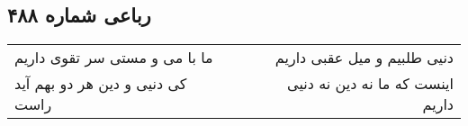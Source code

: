 \begin{center}
\section*{رباعی شماره ۴۸۸}
\label{sec:sh488}
\begin{longtable}{l p{0.5cm} r}
ما با می و مستی سر تقوی داریم
&&
دنیی طلبیم و میل عقبی داریم
\\
کی دنیی و دین هر دو بهم آید راست
&&
اینست که ما نه دین نه دنیی داریم
\\
\end{longtable}
\end{center}
